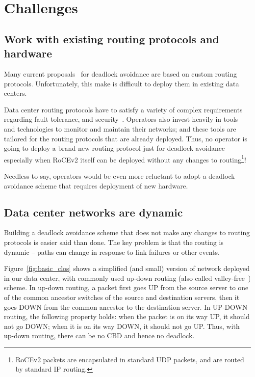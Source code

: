 \section{Challenges}
\label{sec:challenges}

\subsection{Work with existing routing protocols and hardware}
\label{sec:incremental}

Many current
proposals~\cite{dally,duato93,dally93,sancho2004,flich2012survey,lash,wu2003fault,glass,duato2001,domke2011,puente1999,dfedst16}
for deadlock avoidance are based on custom routing
protocols. Unfortunately, this make is difficult to deploy them in existing data
centers.

Data center routing protocols have to satisfy a variety of complex requirements
regarding fault tolerance, and security~\cite{beckett2016don}.  Operators also
invest heavily in  tools and technologies to monitor and maintain their
networks; and these tools are tailored for the routing protocols that are
already deployed.  Thus, no operator is going to deploy a brand-new routing
protocol just for deadlock avoidance --  especially when RoCEv2 itself can be
deployed without any changes to routing\footnote{RoCEv2 packets are encapsulated
in standard UDP packets, and are routed by standard IP routing.}!

Needless to say, operators would be even more reluctant to
adopt a deadlock avoidance scheme that requires deployment of new hardware. 

\subsection{Data center networks are dynamic}\label{sec:reroute}

Building a deadlock avoidance scheme that does not make any changes to routing
protocols is easier said than done. The key problem is that the routing is
dynamic -- paths can change in response to link failures or other events.

Figure~\ref{fig:basic_clos} shows a simplified (and small) version
of network deployed in our data center, with commonly used up-down routing (also
called valley-free~\cite{qiu2007toward}) scheme.  In up-down routing, a packet first
goes UP from the source server to one of the common ancestor switches of the
source and destination servers, then it goes DOWN from the common ancestor to
the destination server.  In UP-DOWN routing, the following property holds: when
the packet is on its way UP, it should not go DOWN; when it is on its way DOWN,
it should not go UP. Thus, with up-down routing, there can be no CBD and hence
no deadlock.

